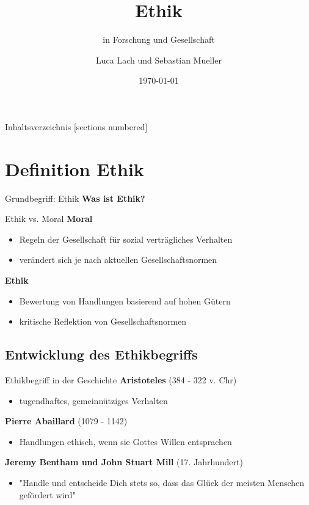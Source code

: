 \documentclass[10pt]{beamer}
\title{Ethik}
\subtitle{in Forschung und Gesellschaft}
\date{\today}
\author{Luca Lach und Sebastian Mueller}
\institute{}
\begin{document}
		
	\maketitle
	
	\begin{frame}{Inhaltsverzeichnis}
		[sections numbered]
		\tableofcontents[hideallsubsections]
	\end{frame}
	
\section{Definition Ethik}
	\begin{frame}{Grundbegriff: Ethik}
		\textbf{Was ist Ethik?}
	\end{frame}
	
	\begin{frame}{Ethik vs. Moral}
		\textbf{Moral}
			\begin{itemize}
				\item Regeln der Gesellschaft für sozial verträgliches Verhalten
				\item verändert sich je nach aktuellen Gesellschaftsnormen
			\end{itemize}
		\textbf{Ethik}
		\begin{itemize}
			\item Bewertung von Handlungen basierend auf hohen Gütern
			\item kritische Reflektion von Gesellschaftsnormen
		\end{itemize}
			
	\end{frame}
		

	
\subsection{Entwicklung des Ethikbegriffs}
	\begin{frame}{Ethikbegriff in der Geschichte}
		\textbf{Aristoteles} (384 - 322 v. Chr)
		\begin{itemize}
			\item tugendhaftes, gemeinnütziges Verhalten
		\end{itemize}
		
		\textbf{Pierre Abaillard} (1079 - 1142)
		\begin{itemize}
			\item Handlungen ethisch, wenn sie Gottes Willen entsprachen
		\end{itemize}
		
		\textbf{Jeremy Bentham und John Stuart Mill} (17. Jahrhundert)
		\begin{itemize}
			\item "Handle und entscheide Dich stets so, dass das Glück der
			meisten Menschen gefördert wird"
		\end{itemize}
	\end{frame}
	
\end{document}
